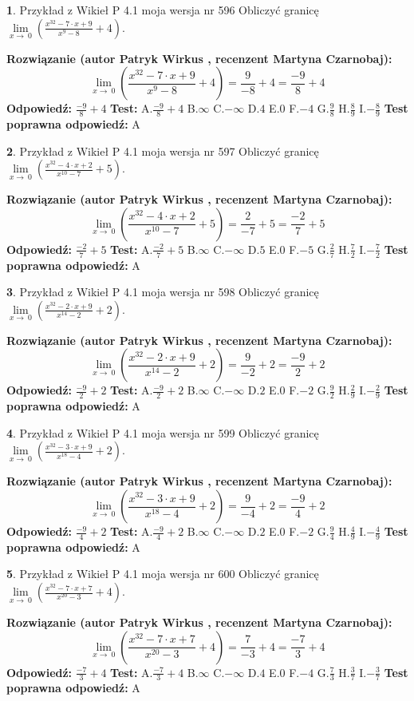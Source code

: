 \documentclass[12pt, a4paper]{article}
\theoremstyle{definition} %
\newtheorem{zad}{}
\newcommand{\zadStart}[1]{\begin{zad}#1\newline}
\newcommand{\zadStop}{\end{zad}}
\newcommand{\rozwStart}[2]{\noindent \textbf{Rozwiązanie (autor #1 , recenzent #2): }\newline}
\newcommand{\rozwStop}{\newline}
\newcommand{\odpStart}{\noindent \textbf{Odpowiedź:}\newline}
\newcommand{\odpStop}{\newline}
\newcommand{\testStart}{\noindent \textbf{Test:}\newline}
\newcommand{\testStop}{\newline}
\newcommand{\kluczStart}{\noindent \textbf{Test poprawna odpowiedź:}\newline}
\newcommand{\kluczStop}{\newline}
\begin{document}
\zadStart{Przykład z Wikieł P 4.1 moja wersja nr 596}
Obliczyć granicę $\lim\limits_{x\to\ 0}(\frac{x^{32}-7 \cdot x +9}{x^{9}-8}+4)$.
\zadStop
\rozwStart{Patryk Wirkus}{Martyna Czarnobaj}
$$\lim\limits_{x\to\ 0}(\frac{x^{32}-7 \cdot x +9}{x^{9}-8}+4)=\frac{9}{-8}+4=\frac{-9}{8}+4$$
\rozwStop
\odpStart
$\frac{-9}{8}+4$
\odpStop
\testStart
A.$\frac{-9}{8}+4$
B.$\infty$
C.$-\infty$
D.$4$
E.$0$
F.$-4$
G.$\frac{9}{8}$
H.$\frac{8}{9}$
I.$-\frac{8}{9}$
\testStop
\kluczStart
A
\kluczStop



\zadStart{Przykład z Wikieł P 4.1 moja wersja nr 597}
Obliczyć granicę $\lim\limits_{x\to\ 0}(\frac{x^{32}-4 \cdot x +2}{x^{10}-7}+5)$.
\zadStop
\rozwStart{Patryk Wirkus}{Martyna Czarnobaj}
$$\lim\limits_{x\to\ 0}(\frac{x^{32}-4 \cdot x +2}{x^{10}-7}+5)=\frac{2}{-7}+5=\frac{-2}{7}+5$$
\rozwStop
\odpStart
$\frac{-2}{7}+5$
\odpStop
\testStart
A.$\frac{-2}{7}+5$
B.$\infty$
C.$-\infty$
D.$5$
E.$0$
F.$-5$
G.$\frac{2}{7}$
H.$\frac{7}{2}$
I.$-\frac{7}{2}$
\testStop
\kluczStart
A
\kluczStop



\zadStart{Przykład z Wikieł P 4.1 moja wersja nr 598}
Obliczyć granicę $\lim\limits_{x\to\ 0}(\frac{x^{32}-2 \cdot x +9}{x^{14}-2}+2)$.
\zadStop
\rozwStart{Patryk Wirkus}{Martyna Czarnobaj}
$$\lim\limits_{x\to\ 0}(\frac{x^{32}-2 \cdot x +9}{x^{14}-2}+2)=\frac{9}{-2}+2=\frac{-9}{2}+2$$
\rozwStop
\odpStart
$\frac{-9}{2}+2$
\odpStop
\testStart
A.$\frac{-9}{2}+2$
B.$\infty$
C.$-\infty$
D.$2$
E.$0$
F.$-2$
G.$\frac{9}{2}$
H.$\frac{2}{9}$
I.$-\frac{2}{9}$
\testStop
\kluczStart
A
\kluczStop



\zadStart{Przykład z Wikieł P 4.1 moja wersja nr 599}
Obliczyć granicę $\lim\limits_{x\to\ 0}(\frac{x^{32}-3 \cdot x +9}{x^{18}-4}+2)$.
\zadStop
\rozwStart{Patryk Wirkus}{Martyna Czarnobaj}
$$\lim\limits_{x\to\ 0}(\frac{x^{32}-3 \cdot x +9}{x^{18}-4}+2)=\frac{9}{-4}+2=\frac{-9}{4}+2$$
\rozwStop
\odpStart
$\frac{-9}{4}+2$
\odpStop
\testStart
A.$\frac{-9}{4}+2$
B.$\infty$
C.$-\infty$
D.$2$
E.$0$
F.$-2$
G.$\frac{9}{4}$
H.$\frac{4}{9}$
I.$-\frac{4}{9}$
\testStop
\kluczStart
A
\kluczStop



\zadStart{Przykład z Wikieł P 4.1 moja wersja nr 600}
Obliczyć granicę $\lim\limits_{x\to\ 0}(\frac{x^{32}-7 \cdot x +7}{x^{20}-3}+4)$.
\zadStop
\rozwStart{Patryk Wirkus}{Martyna Czarnobaj}
$$\lim\limits_{x\to\ 0}(\frac{x^{32}-7 \cdot x +7}{x^{20}-3}+4)=\frac{7}{-3}+4=\frac{-7}{3}+4$$
\rozwStop
\odpStart
$\frac{-7}{3}+4$
\odpStop
\testStart
A.$\frac{-7}{3}+4$
B.$\infty$
C.$-\infty$
D.$4$
E.$0$
F.$-4$
G.$\frac{7}{3}$
H.$\frac{3}{7}$
I.$-\frac{3}{7}$
\testStop
\kluczStart
A
\kluczStop
\end{document}
